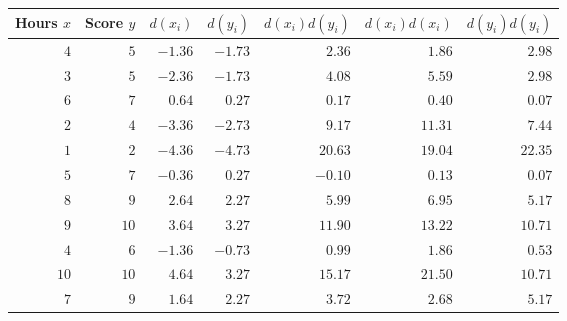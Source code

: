 \begin{tabular}{rrrrrrr}                                                                        \toprule
Hours $x$ & Score $y$ & $d(x_i)$ & $d(y_i)$ & $d(x_i)d(y_i)$ & $d(x_i)d(x_i)$ & $d(y_i)d(y_i)$ \\\midrule
$4$       & $5$       & $-1.36$  & $-1.73$  & $2.36$        & $1.86$         & $2.98$         \\
$3$       & $5$       & $-2.36$  & $-1.73$  & $4.08$        & $5.59$         & $2.98$         \\
$6$       & $7$       & $0.64$   & $0.27$   & $0.17$        & $0.40$         & $0.07$         \\
$2$       & $4$       & $-3.36$  & $-2.73$  & $9.17$        & $11.31$        & $7.44$         \\
$1$       & $2$       & $-4.36$  & $-4.73$  & $20.63$       & $19.04$        & $22.35$        \\
$5$       & $7$       & $-0.36$  & $0.27$   & $-0.10$       & $0.13$         & $0.07$         \\
$8$       & $9$       & $2.64$   & $2.27$   & $5.99$        & $6.95$         & $5.17$         \\
$9$       & $10$      & $3.64$   & $3.27$   & $11.90$       & $13.22$        & $10.71$        \\
$4$       & $6$       & $-1.36$  & $-0.73$  & $0.99$        & $1.86$         & $0.53$         \\
$10$      & $10$      & $4.64$   & $3.27$   & $15.17$       & $21.50$        & $10.71$        \\
$7$       & $9$       & $1.64$   & $2.27$   & $3.72$        & $2.68$         & $5.17$         \\\bottomrule
\end{tabular}

